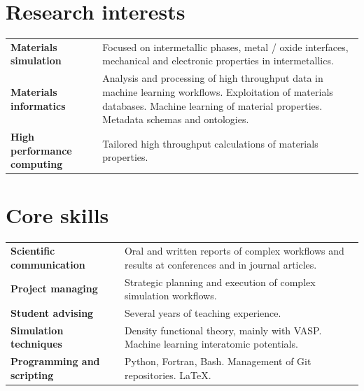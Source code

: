 

\vspace{-0.5cm}
\section{Research interests}
\vspace{-0.5cm}
\setlength{\tabcolsep}{0.2cm} %
\renewcommand{\arraystretch}{1.5} %
\begin{tabular}{p{6cm} p{11cm}}
	\hfill \textbf{Materials simulation} & Focused on intermetallic phases, metal / oxide interfaces, 
	mechanical and electronic properties in intermetallics. \\
	
	\hfill\textbf{Materials informatics} & Analysis and processing of high throughput data in machine learning workflows. Exploitation of materials databases. Machine learning of material properties. Metadata schemas and ontologies.\\
	
	\textbf{High performance computing} & Tailored high throughput calculations of materials properties.
	
\end{tabular}
\vspace{-0.5cm}
\section{Core skills}
\vspace{-0.5cm}
\begin{tabular}{p{6cm} p{11cm}}
	\hfill\textbf{Scientific communication} &  Oral and written reports of complex workflows and results at conferences and in journal articles. \\
	\hfill\textbf{Project managing} & Strategic planning and execution of complex simulation workflows. \\
	\hfill\textbf{Student advising} & Several years of teaching experience. \\
	\hfill\textbf{Simulation techniques} & Density functional theory, mainly with VASP. Machine learning interatomic potentials. \\ 
	\hfill\textbf{Programming and scripting} & Python, Fortran, Bash. Management of Git repositories. \LaTeX. \\
\end{tabular}

